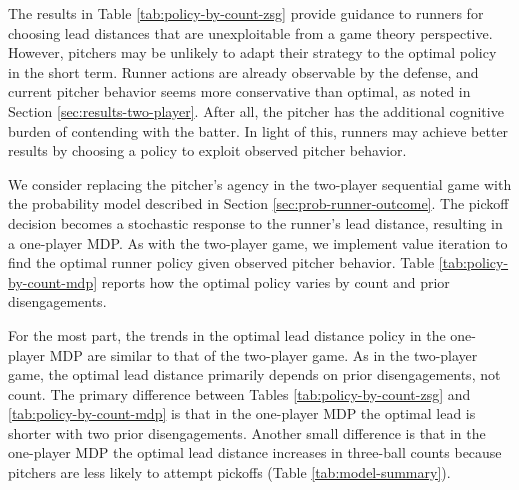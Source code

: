 \documentclass[aoas]{imsart}
\newcommand{\tablepath}{../../output/tables/}
\newcommand{\inputtable}[1]{}
\begin{document}
      The results in Table \ref{tab:policy-by-count-zsg} provide guidance to runners for choosing lead distances that are unexploitable from a game theory perspective. However, pitchers may be unlikely to adapt their strategy to the optimal policy in the short term. Runner actions are already observable by the defense, and current pitcher behavior seems more conservative than optimal, as noted in Section \ref{sec:results-two-player}. After all, the pitcher has the additional cognitive burden of contending with the batter. In light of this, runners may achieve better results by choosing a policy to exploit observed pitcher behavior.

      We consider replacing the pitcher's agency in the two-player sequential game with the probability model described in Section \ref{sec:prob-runner-outcome}. The pickoff decision becomes a stochastic response to the runner's lead distance, resulting in a one-player MDP. As with the two-player game, we implement value iteration to find the optimal runner policy given observed pitcher behavior. Table \ref{tab:policy-by-count-mdp} reports how the optimal policy varies by count and prior disengagements.

      \begin{table}
        \inputtable{policy_by_count_mdp.tex}
        \caption{
          \it The optimal lead distance (in feet) by count and prior disengagements under the one-player MDP, assuming an average runner on first base facing an average battery (pitcher and catcher) with no outs and third base empty. Estimates include standard errors estimated via bootstrapping.
        }
        \label{tab:policy-by-count-mdp}
      \end{table}

      For the most part, the trends in the optimal lead distance policy in the one-player MDP are similar to that of the two-player game. As in the two-player game, the optimal lead distance primarily depends on prior disengagements, not count. The primary difference between Tables \ref{tab:policy-by-count-zsg} and \ref{tab:policy-by-count-mdp} is that in the one-player MDP the optimal lead is shorter with two prior disengagements. Another small difference is that in the one-player MDP the optimal lead distance increases in three-ball counts because pitchers are less likely to attempt pickoffs (Table \ref{tab:model-summary}).
\end{document}
